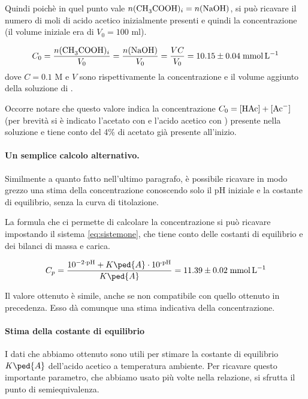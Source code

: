 Quindi poichè in quel punto vale $n(\ce{CH3COOH})_i = n(\ce{NaOH})$, si può ricavare il numero di moli di
acido acetico inizialmente presenti e quindi la concentrazione (il volume iniziale era di $V_0 = 100$ ml).

\begin{equation}
    C_0 = \frac{n(\ce{CH3COOH})_i}{V_0} = \frac{n(\ce{NaOH})}{V_0} = \frac{VC}{V_0} = 10.15 \pm 0.04 \; \si{\milli\mol\per\litre}
\end{equation}
%
dove $C = 0.1$ M e $V$ sono rispettivamente la concentrazione e il volume aggiunto della soluzione di .

Occorre notare che questo valore indica la concentrazione $C_0 = \ce{[HAc] + [Ac- ]}$ (per brevità si è indicato l'acetato con  e l'acido acetico con ) presente nella soluzione
e tiene conto del 4\% di acetato già presente all'inizio.

\paragraph{Un semplice calcolo alternativo.}

Similmente a quanto fatto nell'ultimo paragrafo, è possibile ricavare in modo grezzo una stima
della concentrazione conoscendo solo il pH iniziale e la costante di equilibrio, senza
la curva di titolazione.

La formula che ci permette di calcolare la concentrazione si può ricavare impostando il sistema \eqref{eq:sistemone},
che tiene conto delle costanti di equilibrio e dei bilanci di massa e carica.

\begin{equation}
    C_p = \frac{10^{-2 \cdot \text{pH}} + K\ped{A} \cdot 10^\text{-pH}}{K\ped{A}} = 11.39 \pm 0.02 \; \si{\milli\mol\per\litre}
\end{equation}

Il valore ottenuto è simile, anche se non compatibile con quello ottenuto in precedenza.
Esso dà comunque una stima indicativa della concentrazione.

\paragraph{Stima della costante di equilibrio}

I dati che abbiamo ottenuto sono utili per stimare la costante di equilibrio $K\ped{A}$ dell'acido
acetico a temperatura ambiente. Per ricavare questo importante parametro, che abbiamo usato più
volte nella relazione, si sfrutta il punto di semiequivalenza.

